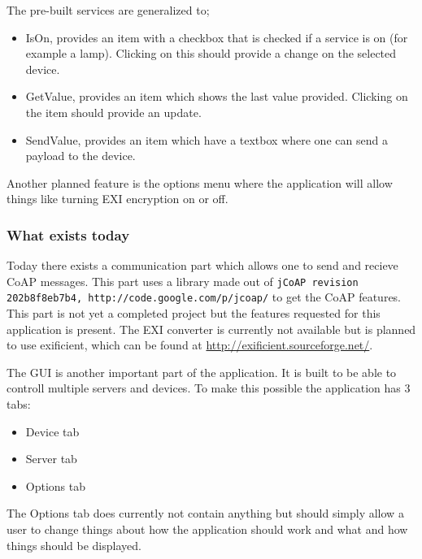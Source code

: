 The pre-built services are generalized to; 
\begin{itemize}
 \item IsOn, provides an item with a checkbox that is checked if a service is on (for example a lamp). Clicking on this should provide a change on the selected device.
 \item GetValue, provides an item which shows the last value provided. Clicking on the item should provide an update.
 \item SendValue, provides an item which have a textbox where one can send a payload to the device. %
\end{itemize}

Another planned feature is the options menu where the application will allow things like turning EXI encryption on or off. 

\subsubsection{What exists today}

Today there exists a communication part which allows one to send and recieve CoAP messages. This part uses a library made out of \texttt{jCoAP revision 202b8f8eb7b4, http://code.google.com/p/jcoap/}%
to get the CoAP features. This part is not yet a completed project but the features requested for this application is present. The EXI converter is currently not available but is planned to use exificient, 
which can be found at \url{http://exificient.sourceforge.net/}.

The GUI is another important part of the application. It is built to be able to controll multiple servers and devices. 
To make this possible the application has 3 tabs:	%
\begin{itemize}
 \item Device tab
 \item Server tab
 \item Options tab
\end{itemize}

The Options tab does currently not contain anything but should simply allow a user to change things about how the application should work and what and how things should be displayed. 

